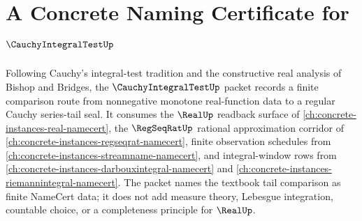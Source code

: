 \chapter{A Concrete Naming Certificate for $\CauchyIntegralTestUp$}
\label{ch:concrete-instances-cauchy-integral-test-namecert}

Following Cauchy's integral-test tradition and the constructive real analysis of Bishop and Bridges, the $\CauchyIntegralTestUp$ packet records a finite comparison route from nonnegative monotone real-function data to a regular Cauchy series-tail seal. It consumes the $\RealUp$ readback surface of \autoref{ch:concrete-instances-real-namecert}, the $\RegSeqRatUp$ rational approximation corridor of \autoref{ch:concrete-instances-regseqrat-namecert}, finite observation schedules from \autoref{ch:concrete-instances-streamname-namecert}, and integral-window rows from \autoref{ch:concrete-instances-darbouxintegral-namecert} and \autoref{ch:concrete-instances-riemannintegral-namecert}. The packet names the textbook tail comparison as finite NameCert data; it does not add measure theory, Lebesgue integration, countable choice, or a completeness principle for $\RealUp$.

